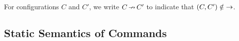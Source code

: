\documentclass[11pt]{report}
\begin{document}
% 			
% 			
% 			
% 
% 
% 
% 
% 			
% 
% 			
% 
% 			
% 			
% 			
% 
% 			
% 			
% 			
% 			
% 			
% 			


For configurations $C$ and $C'$, we write $C \operatorname{\nrightarrow} C'$ to indicate that $(C,C') \notin \operatorname{\rightarrow}$. 

\subsection{Static Semantics of Commands} %
\label{sub:static_semantics}
\end{document}
